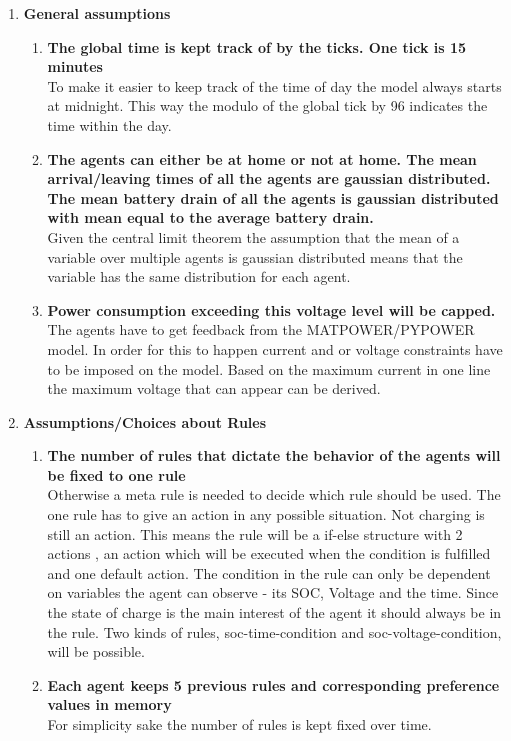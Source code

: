 \documentclass[a4paper]{article}
\begin{document}
\begin{enumerate}
 \item \textbf{General assumptions} \begin{enumerate}
                            \item \textbf{The global time is kept track of by the ticks. One tick is 15 minutes} \\
			     To make it easier to keep track of the time of day the model always starts at midnight. 
			     This way the modulo of the global tick by 96 indicates the time within the day.
			    \item \textbf{The agents can either be at home or not at home. The mean arrival/leaving times of 
			    all the agents are gaussian distributed. The mean battery drain of all the agents is 
			    gaussian distributed with mean equal to the average battery drain.} \\
			    Given the central limit theorem the assumption that the mean of a variable over multiple agents is 
			    gaussian distributed  means that  the variable has the same distribution for each agent.
			    \item \textbf{Power consumption exceeding this voltage level will be capped. } \\
			    The agents have to get feedback from the MATPOWER/PYPOWER model. In order for this to happen current 
			    and or voltage constraints have to be imposed on the model. Based on the maximum current in one
			    line the maximum voltage that can appear can be derived. 
                           \end{enumerate}
 \item \textbf{Assumptions/Choices  about Rules} \begin{enumerate}
                                         \item \textbf{The number of rules that dictate the behavior of the agents will be 
                                         fixed to one rule} \\
                                         Otherwise a meta rule is needed to decide which rule should be used. 
					 The one rule has to give an action in any possible situation. Not charging is still
					 an action. This means the rule will be a if-else structure with 2 actions , 
					 an action which will be executed when the condition is fulfilled and one default 
					 action.
					 The condition in the rule can only be dependent on variables the agent can observe - 
					 its SOC, Voltage and the time. Since the state of charge is the main interest of the
					 agent it should always be in the rule. Two kinds of rules, soc-time-condition and 
					 soc-voltage-condition, will be possible.
					 \item \textbf{Each agent keeps  5 previous rules and corresponding preference 
					 values in memory }\\
					 For simplicity sake the number of rules is kept fixed over time.
					 

\end{enumerate}
\end{enumerate}
\end{document}
